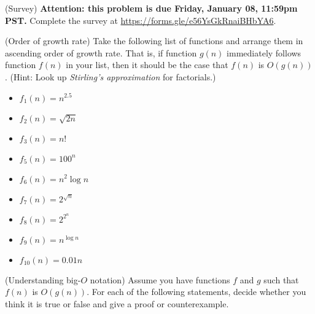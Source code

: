 \begin{questions}

  \question[5] (Survey) \textbf{Attention: this problem is due Friday,
    January 08, 11:59pm PST.} Complete the survey at
  {\url{https://forms.gle/e56YsGkRnaiBHbYA6}}.

  \question[15] (Order of growth rate) Take the following list of
  functions and arrange them in ascending order of growth rate. That
  is, if function $g(n)$ immediately follows function $f(n)$ in your
  list, then it should be the case that $f(n)$ is $O(g(n))$. (Hint:
  Look up \emph{Stirling’s approximation} for factorials.)
  \begin{itemize}
  \item $f_1(n) = n^{2.5}$
  \item $f_2(n) = \sqrt{2n}$
  \item $f_3(n)= n !$
  \item $f_5(n) = 100^n$
  \item $f_6(n) = n^2 \log n$
  \item $f_7(n) = 2^{\sqrt{n}}$
  \item $f_8(n) = 2^{2^n}$
  \item $f_9(n) = n^{\log n}$
  \item $f_{10}(n) = 0.01n$    
  \end{itemize}


  \newpage 
  
  \question[15] (Understanding big-$O$ notation) Assume you have
  functions $f$ and $g$ such that $f(n)$ is $O(g(n))$. For each of the
  following statements, decide whether you think it is true or false
  and give a proof or counterexample.
  \newpage


\end{questions}

